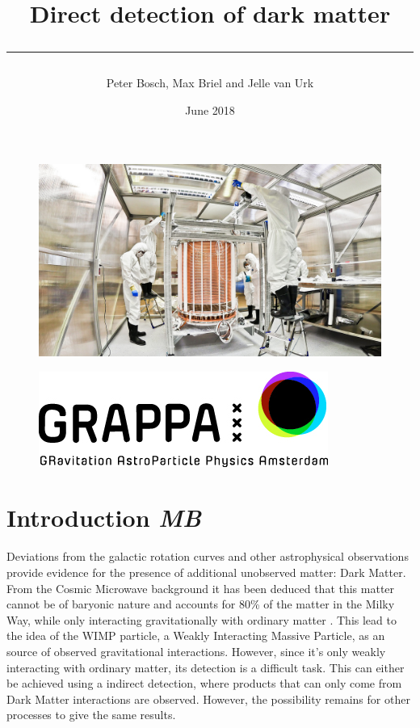 \documentclass{article}
\title{\textbf{Direct detection of dark matter}\\\noindent\rule{12cm}{0.4pt}}
\author{Peter Bosch, Max Briel and Jelle van Urk}
\date{June 2018}
\begin{document}
\maketitle
\vfill
\begin{figure}[hb]
    \centering
    \includegraphics[width=\textwidth]{XENON1T-s.jpg}
\end{figure}
\vspace{2.cm}
\begin{figure}[hb]
    \centering
    \includegraphics[width=.5\textwidth]{GRAPPA.jpg}
\end{figure}
\FloatBarrier
\newpage
{}
\setcounter{page}{2}
\tableofcontents
\newpage

\section{Introduction \small{\textit{MB}}}

Deviations from the galactic rotation curves and other astrophysical observations provide evidence for the presence of additional unobserved matter: Dark Matter. From the Cosmic Microwave background it has been deduced that this matter cannot be of baryonic nature and accounts for 80\% of the matter in the Milky Way, while only interacting gravitationally with ordinary matter \cite{Ade:2015xua}. 
This lead to the idea of the WIMP particle, a Weakly Interacting Massive Particle, as an source of observed gravitational interactions. 
However, since it's only weakly interacting with ordinary matter, its detection is a difficult task. This can either be achieved using a indirect detection, where products that can only come from Dark Matter interactions are observed. However, the possibility remains for other processes to give the same results. 
\end{document}
